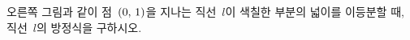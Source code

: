 \noindent\begin{minipage}[t]{0.58\linewidth}\vspace{0pt}\raggedright 오른쪽 그림과 같이 점~$(0,\mkern3mu 1)$을 지나는 직선~$l$이 색칠한 부분의 넓이를 이등분할 때, 직선~$l$의 방정식을 구하시오.\end{minipage}\hfill\begin{minipage}[t]{0.4\linewidth}\vspace{0pt}\centering \resizebox{\ifdim\width>\linewidth\linewidth\else\width\fi}{!}{}\end{minipage}\par
